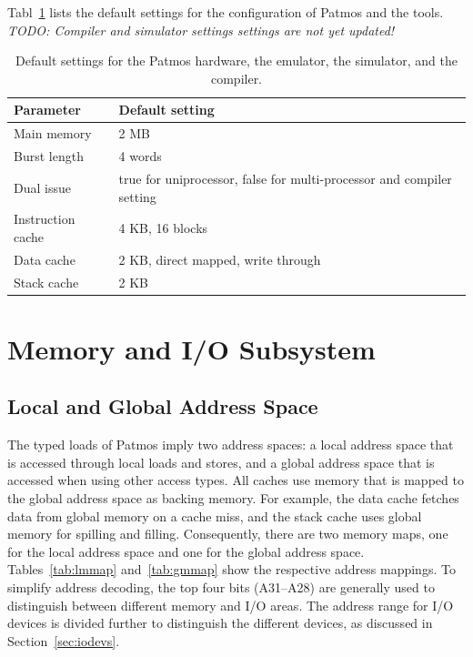 \documentclass[a4paper,fontsize=10pt,twoside,DIV15,BCOR12mm,headinclude=true,footinclude=false,pagesize,bibtotoc]{scrbook}
\newcommand{\todo}[1]{{\emph{TODO: #1}}}
\begin{document}
Tabl~\ref{tab:defaults} lists the default settings for the configuration of Patmos
and the tools. \todo{Compiler and simulator settings settings are not yet updated!}

\begin{table}
\centering
\begin{tabular}{ll}
\toprule
Parameter & Default setting \\
\midrule
Main memory & 2 MB \\
Burst length & 4 words \\
Dual issue & true for uniprocessor, false for multi-processor and compiler setting \\
Instruction cache & 4 KB, 16 blocks \\
Data cache & 2 KB, direct mapped, write through \\
Stack cache & 2 KB \\
\bottomrule
\end{tabular}
\caption{Default settings for the Patmos hardware, the emulator, the simulator, and the compiler.}
\label{tab:defaults}
\end{table}

\chapter{Memory and I/O Subsystem}
\label{chap:memsyst}

\section{Local and Global Address Space}

The typed loads of Patmos imply two address spaces: a local address
space that is accessed through local loads and stores, and a global
address space that is accessed when using other access types. All
caches use memory that is mapped to the global address space as
backing memory. For example, the data cache fetches data from global
memory on a cache miss, and the stack cache uses global memory for
spilling and filling. Consequently, there are two memory maps, one for
the local address space and one for the global address
space. Tables~\ref{tab:lmmap} and~\ref{tab:gmmap} show the respective
address mappings. To simplify address decoding, the top four bits
(A31--A28) are generally used to distinguish between different memory
and I/O areas. The address range for I/O devices is divided further to
distinguish the different devices, as discussed in
Section~\ref{sec:iodevs}.
\end{document}
